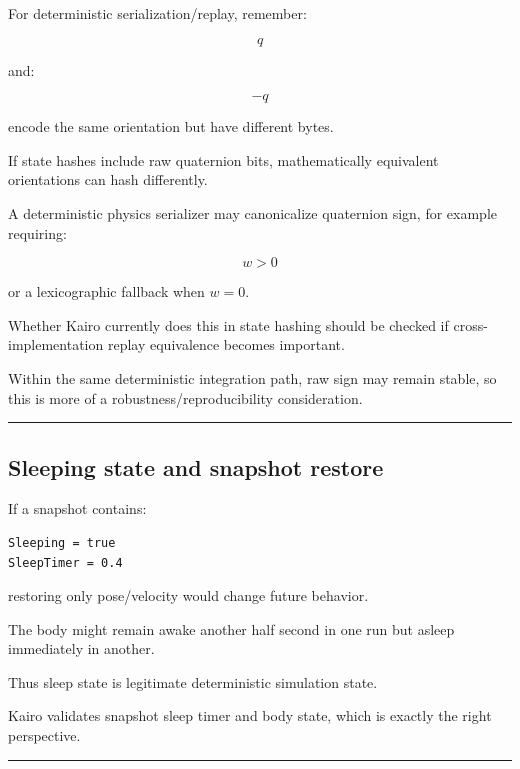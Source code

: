 \hypertarget{06-engine-ii-ch038-quaternion-sign-canonicalization}{}

For deterministic serialization/replay, remember:

\[
q
\]

and:

\[
-q
\]

encode the same orientation but have different bytes.

If state hashes include raw quaternion bits, mathematically equivalent orientations can hash differently.

A deterministic physics serializer may canonicalize quaternion sign, for example requiring:

\[
w>0
\]

or a lexicographic fallback when \(w=0\).

Whether Kairo currently does this in state hashing should be checked if cross-implementation replay equivalence becomes important.

Within the same deterministic integration path, raw sign may remain stable, so this is more of a robustness/reproducibility consideration.

\begin{center}\rule{0.5\linewidth}{0.5pt}\end{center}

\subsection{Sleeping state and snapshot restore}\label{06-engine-ii-ch038-sleeping-state-and-snapshot-restore}

\hypertarget{06-engine-ii-ch038-sleeping-state-and-snapshot-restore}{}

If a snapshot contains:

\begin{verbatim}
Sleeping = true
SleepTimer = 0.4
\end{verbatim}

restoring only pose/velocity would change future behavior.

The body might remain awake another half second in one run but asleep immediately in another.

Thus sleep state is legitimate deterministic simulation state.

Kairo validates snapshot sleep timer and body state, which is exactly the right perspective.

\begin{center}\rule{0.5\linewidth}{0.5pt}\end{center}

